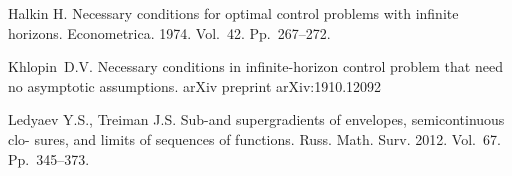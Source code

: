 	\begin{thebibliography}{99}
Halkin H. {    Necessary conditions for optimal control problems with infinite horizons}. Econometrica. 1974. Vol.~42. Pp.~267--272.

Khlopin~D.V. {  Necessary conditions in infinite-horizon control problem
	that need no asymptotic assumptions}. arXiv preprint arXiv:1910.12092

 Ledyaev Y.S., Treiman J.S. {  Sub-and supergradients of envelopes, semicontinuous clo-
sures, and limits of sequences of functions.} Russ. Math. Surv. 2012. Vol.~67. Pp.~345--373.
	\end{thebibliography}






%
